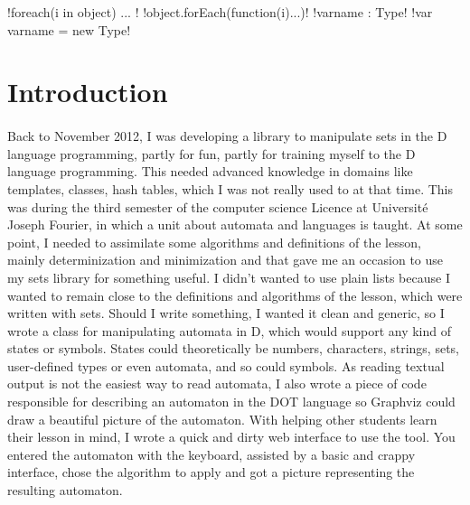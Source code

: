 \documentclass{article}
\begin{document}
\maketitle
\tableofcontents
\begin{sloppypar}
\DefineShortVerb{\!}
!foreach(i in object) { ... }!
!object.forEach(function(i){...})!
!varname : Type!
!var varname = new Type!
\UndefineShortVerb{\!}




\section*{ Introduction}


\paragraph{}
Back to November 2012, I was developing a library to manipulate sets in the D language programming, partly for fun, partly for training myself to the D language programming. This needed advanced knowledge in domains like templates, classes, hash tables, which I was not really used to at that time. This was during the third semester of the computer science Licence at Université Joseph Fourier, in which a unit about automata and languages is taught. At some point, I needed to assimilate some algorithms and definitions of the lesson, mainly determinization and minimization and that gave me an occasion to use my sets library for something useful. I didn't wanted to use plain lists because I wanted to remain close to the definitions and algorithms of the lesson, which were written with sets. Should I write something, I wanted it clean and generic, so I wrote a class for manipulating automata in D, which would support any kind of states or symbols. States could theoretically be numbers, characters, strings, sets, user-defined types or even automata, and so could symbols. As reading textual output is not the easiest way to read automata, I also wrote a piece of code responsible for describing an automaton in the DOT language so Graphviz could draw a beautiful picture of the automaton. With helping other students learn their lesson in mind, I wrote a quick and dirty web interface to use the tool. You entered the automaton with the keyboard, assisted by a basic and crappy interface, chose the algorithm to apply and got a picture representing the resulting automaton.

   

\end{sloppypar}
\end{document}
